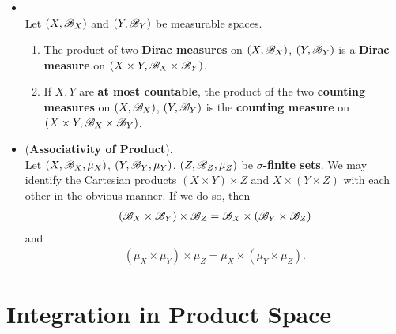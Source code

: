 \documentclass[11pt]{article}
\begin{document}
\begin{itemize}
\item \begin{proposition}\citep{tao2011introduction}\\
Let  $(X, {\mathscr B}_X)$ and $(Y, {\mathscr B}_Y)$ be measurable spaces.
\begin{enumerate}
\item The product of two \textbf{Dirac measures} on $(X, {\mathscr B}_X)$,  $(Y, {\mathscr B}_Y)$ is a \textbf{Dirac measure} on $(X \times Y, {\mathscr B}_X \times {\mathscr B}_Y)$.

\item If $X, Y$ are \textbf{at most countable}, the product of the two \textbf{counting measures} on $(X, {\mathscr B}_X)$,  $(Y, {\mathscr B}_Y)$ is the \textbf{counting measure} on $(X \times Y, {\mathscr B}_X \times {\mathscr B}_Y)$.
\end{enumerate}
\end{proposition}

\item \begin{proposition} (\textbf{Associativity of Product}). \citep{tao2011introduction}\\
Let $(X, {\mathscr B}_X, \mu_X)$, $(Y, {\mathscr B}_Y, \mu_Y)$, $(Z, {\mathscr B}_Z, \mu_Z)$ be \textbf{$\sigma$-finite sets}. We may identify the Cartesian products
$(X \times Y) \times Z$ and $X \times (Y \times Z)$ with each other in the obvious manner. If we do so, then 
\begin{align*}
 ({\mathscr B}_X \times {\mathscr B}_Y) \times {\mathscr B}_Z = {\mathscr B}_X \times ({\mathscr B}_Y \times {\mathscr B}_Z) 
\end{align*}
and
\begin{align*}
(\mu_X \times \mu_Y ) \times \mu_Z = \mu_X \times (\mu_Y \times \mu_Z).
\end{align*}
\end{proposition}
\end{itemize}

\section{Integration in Product Space}
\end{document}
